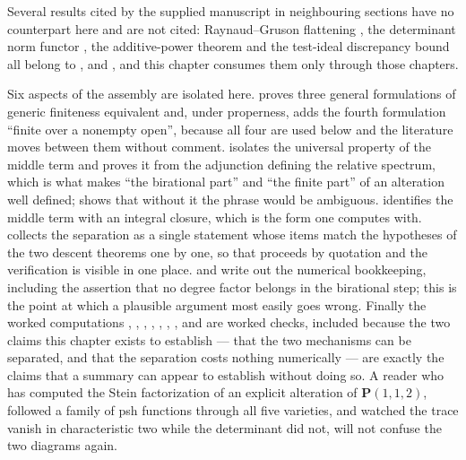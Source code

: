 Several results cited by the supplied manuscript in neighbouring sections
have no counterpart here and are not cited: Raynaud--Gruson flattening
\cite{RaynaudGruson1971}, the determinant norm functor \cite{FerrandNorm},
the additive-power theorem \cite{RobertsSingh} and the test-ideal
discrepancy bound \cite{Canton} all belong to
,  and
, and this chapter consumes them
only through those chapters.

Six aspects of the assembly are isolated here.   proves three general
formulations of generic finiteness equivalent and, under properness, adds
the fourth formulation ``finite over a nonempty open'', because all four
are used below and the literature moves between them without comment.
 isolates the universal property of the
middle term and proves it from the adjunction defining the relative
spectrum, which is what makes ``the birational part'' and ``the finite
part'' of an alteration well defined; 
shows that without it the phrase would be ambiguous.
 identifies the middle term with an
integral closure, which is the form one computes with.
 collects the separation as a single statement
whose items match the hypotheses of the two descent theorems one by one, so
that  proceeds by quotation and the verification is
visible in one place.   and
 write out the numerical bookkeeping, including
the assertion that no degree factor belongs in the birational step; this is
the point at which a plausible argument most easily goes wrong.  Finally the
worked computations ,
, ,
, ,
, ,
 and 
are worked checks, included because the two claims this chapter exists to establish
--- that the two mechanisms can be separated, and that the separation costs
nothing numerically --- are exactly the claims that a summary can appear to
establish without doing so.  A reader who has computed the Stein
factorization of an explicit alteration of $\mathbf P(1,1,2)$, followed a
family of psh functions through all five varieties, and watched the trace
vanish in characteristic two while the determinant did not, will not confuse
the two diagrams again.
